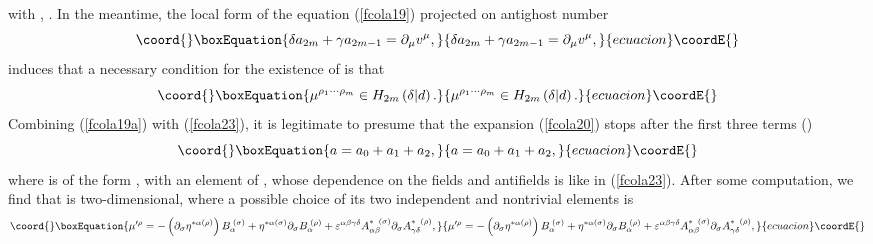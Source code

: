 \documentclass[a4paper,12pt]{article}
\begin{document}
with \coordHE{}, \coordHE{}. In the
meantime, the local form of the equation (\ref{fcola19}) projected on
antighost number \coordHE{}%
\begin{equation}\coord{}\boxEquation{
\delta a_{2m}+\gamma a_{2m-1}=\partial _{\mu }v^{\mu },  \label{fcola22}
}{
\delta a_{2m}+\gamma a_{2m-1}=\partial _{\mu }v^{\mu },  }{ecuacion}\coordE{}\end{equation}
induces that a necessary condition for the existence of \coordHE{} is that 
\begin{equation}\coord{}\boxEquation{
\mu ^{\rho _{1}\cdots \rho _{m}}\in H_{2m}\left( \delta |d\right) .
\label{fcola24}
}{
\mu ^{\rho _{1}\cdots \rho _{m}}\in H_{2m}\left( \delta |d\right) .
}{ecuacion}\coordE{}\end{equation}
Combining (\ref{fcola19a}) with (\ref{fcola23}), it is legitimate to presume
that the expansion (\ref{fcola20}) stops after the first three terms (\coordHE{}) 
\begin{equation}\coord{}\boxEquation{
a=a_{0}+a_{1}+a_{2},  \label{fcola25}
}{
a=a_{0}+a_{1}+a_{2},  }{ecuacion}\coordE{}\end{equation}
where \coordHE{} is of the form \coordHE{}, with \myHighlight{$\mu ^{\rho }$}\coordHE{}
an element of \coordHE{}, whose dependence on the
fields and antifields is like in (\ref{fcola23}). After some computation, we
find that \coordHE{} is two-dimensional, where a
possible choice of its two independent and nontrivial elements is 
\begin{equation}\coord{}\boxEquation{
\mu ^{\prime \rho }=-\left( \partial _{\sigma }\eta ^{*\alpha (\rho
)}\right) B_{\alpha }^{\;(\sigma )}+\eta ^{*\alpha (\sigma )}\partial
_{\sigma }B_{\alpha }^{\;(\rho )}+\varepsilon ^{\alpha \beta \gamma \delta
}A_{\alpha \beta }^{*\;\;(\sigma )}\partial _{\sigma }A_{\gamma \delta
}^{*\;\;(\rho )},  \label{fcola26}
}{
\mu ^{\prime \rho }=-\left( \partial _{\sigma }\eta ^{*\alpha (\rho
)}\right) B_{\alpha }^{\;(\sigma )}+\eta ^{*\alpha (\sigma )}\partial
_{\sigma }B_{\alpha }^{\;(\rho )}+\varepsilon ^{\alpha \beta \gamma \delta
}A_{\alpha \beta }^{*\;\;(\sigma )}\partial _{\sigma }A_{\gamma \delta
}^{*\;\;(\rho )},  }{ecuacion}\coordE{}\end{equation}
\end{document}
